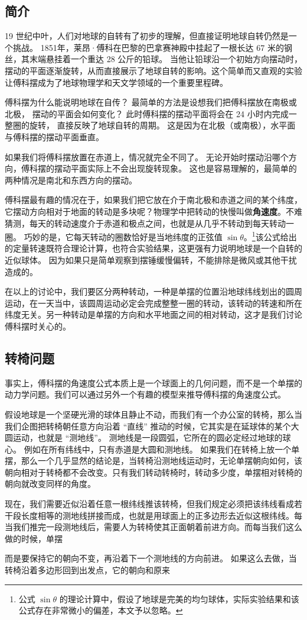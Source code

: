 
\begin{issues}
\issueDraft
\end{issues}

\subsection{简介}
19 世纪中叶，人们对地球的自转有了初步的理解，但直接证明地球自转仍然是一个挑战。 1851年，莱昂·傅科在巴黎的巴拿赛神殿中挂起了一根长达 67 米的钢丝，其末端悬挂着一个重达 28 公斤的铅球。 当他让铅球沿一个初始方向摆动时，摆动的平面逐渐旋转，从而直接展示了地球自转的影响。这个简单而又直观的实验让傅科摆成为了地球物理学和天文学领域的一个重要里程碑。

傅科摆为什么能说明地球在自传？ 最简单的方法是设想我们把傅科摆放在南极或北极， 摆动的平面会如何变化？ 此时傅科摆的摆动平面将会在 24 小时内完成一整圈的旋转， 直接反映了地球自转的周期。 这是因为在北极（或南极），水平面与傅科摆的摆动平面垂直。

如果我们将傅科摆放置在赤道上，情况就完全不同了。 无论开始时摆动沿哪个方向，傅科摆的摆动平面实际上不会出现旋转现象。 这也是容易理解的，最简单的两种情况是南北和东西方向的摆动。

傅科摆最有趣的情况在于，如果我们把它放在介于南北极和赤道之间的某个纬度，它摆动方向相对于地面的转动是多块呢？物理学中把转动的快慢叫做\textbf{角速度}。不难猜测，每天的转动速度介于赤道和极点之间，也就是从几乎不转动到每天转动一圈。 巧妙的是，它每天转动的圈数恰好是当地纬度的正弦值 $\sin\theta$。\footnote{公式 $\sin\theta$ 的理论计算中，假设了地球是完美的均匀球体，实际实验结果和该公式存在非常微小的偏差，本文予以忽略。}该公式给出的定量转速既符合理论计算，也符合实验结果，这更强有力说明地球是一个自转的近似球体。 因为如果只是简单观察到摆锤缓慢偏转，不能排除是微风或其他干扰造成的。

在以上的讨论中，我们要区分两种转动，一种是单摆的位置沿地球纬线划出的圆周运动，在一天当中，该圆周运动必定会完成整整一圈的转动，该转动的转速和所在纬度无关。另一种转动是单摆的方向和水平地面之间的相对转动，这才是我们讨论傅科摆时关心的。

\subsection{转椅问题}
事实上，傅科摆的角速度公式本质上是一个球面上的几何问题，而不是一个单摆的动力学问题。我们可以通过另外一个有趣的模型来推导傅科摆的角速度公式。

假设地球是一个坚硬光滑的球体且静止不动，而我们有一个办公室的转椅，那么当我们企图把转椅朝任意方向沿着 “直线” 推动的时候，它其实是在延球体的某个大圆运动，也就是 “测地线”。 测地线是一段圆弧，它所在的圆必定经过地球的球心。 例如在所有纬线中，只有赤道是大圆和测地线。 如果我们在转椅上放一个单摆，那么一个几乎显然的结论是，当转椅沿测地线运动时，无论单摆朝向如何，该朝向相对于转椅都不会改变。只有我们转动转椅时，转动多少度，单摆相对转椅的朝向就改变同样的角度。

现在，我们需要近似沿着任意一根纬线推该转椅，但我们规定必须把该纬线看成若干段长度相等的测地线拼接而成，也就是用球面上的正多边形去近似这根纬线。每当我们推完一段测地线后，需要人为转椅使其正面朝着前进方向。而每当我们这么做的时候，单摆

而是要保持它的朝向不变，再沿着下一个测地线的方向前进。 如果这么去做，当转椅沿着多边形回到出发点，它的朝向和原来
